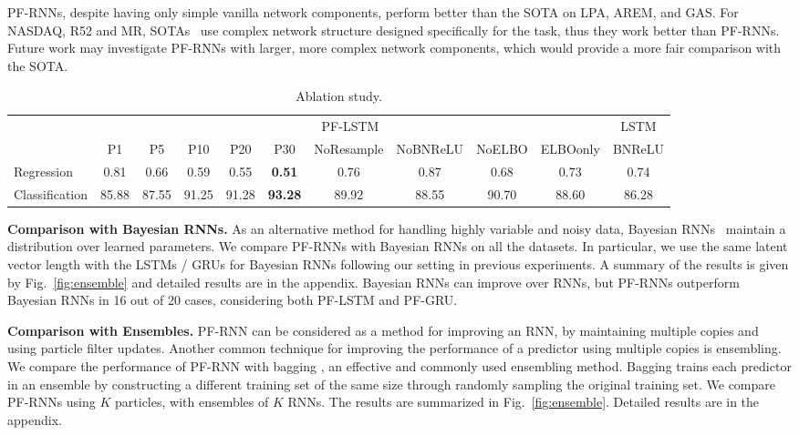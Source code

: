 \documentclass[letterpaper]{article} %
\begin{document}
PF-RNNs, despite having only simple vanilla network components, perform better than the SOTA on LPA, AREM, and GAS. For NASDAQ, R52 and MR, SOTAs~\cite{qin2017dual,zhou2016text,2007:phd-Ana-Cardoso-Cachopo} use complex network structure designed specifically for the task, thus they work better than PF-RNNs. Future work may investigate PF-RNNs with larger, more complex network components, which would provide a more fair %
comparison with the SOTA.
\begin{table}[!htb]
	\centering
	\caption{Ablation study.}
	\label{tab:abl}
	\fontsize{9}{9}\selectfont
	\begin{tabular}{lcccccccccc}
		\toprule
		\multirow{2}{*}{} & \multicolumn{9}{c}{PF-LSTM}                                                                & LSTM   \\
		\cmidrule(lr){2-10}\cmidrule(lr){11-11}
		& P1    & P5    & P10   & P20   & P30  & NoResample & NoBNReLU & NoELBO &ELBOonly & BNReLU \\
		\midrule
		Regression        & 0.81  & 0.66  & 0.59  & 0.55  & \textbf{0.51}  & 0.76  & 0.87         & 0.68     & 0.73   & 0.74   \\
		Classification    & 85.88 & 87.55 & 91.25 & 91.28 & \textbf{93.28} & 89.92 & 88.55        & 90.70    & 88.60  & 86.28 \\
		\bottomrule
	\end{tabular}
\end{table}

\textbf{Comparison with Bayesian RNNs.}
As an alternative method for handling highly variable and noisy data, Bayesian RNNs~\cite{fortunato2017bayesian} maintain a distribution over learned parameters. We compare PF-RNNs with Bayesian RNNs on all the datasets. In particular, we use the same latent vector length with the LSTMs / GRUs for Bayesian RNNs following our setting in previous experiments. A summary of the results is given by Fig.~\ref{fig:ensemble} and detailed results are in the appendix. 
Bayesian RNNs can improve over RNNs, but PF-RNNs outperform Bayesian RNNs in 16 out of 20 cases, considering both PF-LSTM and PF-GRU.    

\textbf{Comparison with Ensembles.}
PF-RNN can be considered as a method for improving an RNN, by maintaining multiple copies and using particle filter updates.
Another common technique for improving the performance of a predictor using multiple copies is ensembling.
We compare the performance of PF-RNN with bagging \cite{breiman1996bagging}, an effective and commonly used ensembling method. Bagging trains each predictor in an ensemble by constructing a different training set of the same size through randomly sampling the original training set. We compare PF-RNNs using $K$ particles, with ensembles of $K$ RNNs. The results are summarized in Fig.~\ref{fig:ensemble}. Detailed results are in the appendix. 
\end{document}
